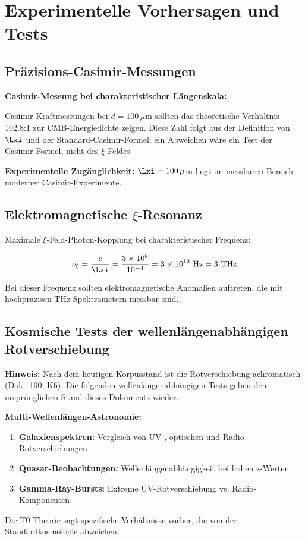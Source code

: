 	\section{Experimentelle Vorhersagen und Tests}
	
	\subsection{Präzisions-Casimir-Messungen}
	
	\begin{experiment}
		\textbf{Casimir-Messung bei charakteristischer Längenskala:}
		
		Casimir-Kraftmessungen bei $d = 100\,\mu$m sollten das theoretische Verhältnis 102.8:1 zur CMB-Energiedichte zeigen. Diese Zahl folgt aus der Definition von $\Lxi$ und der Standard-Casimir-Formel; ein Abweichen wäre ein Test der Casimir-Formel, nicht des $\xi$-Feldes.
		
		\textbf{Experimentelle Zugänglichkeit:} $\Lxi = 100\,\mu$m liegt im messbaren Bereich moderner Casimir-Experimente.
	\end{experiment}
	
	\subsection{Elektromagnetische $\xi$-Resonanz}
	
	Maximale $\xi$-Feld-Photon-Kopplung bei charakteristischer Frequenz:
	
	\begin{equation}
		\nu_\xi = \frac{c}{\Lxi} = \frac{3 \times 10^8}{10^{-4}} = 3 \times 10^{12} \text{ Hz} = 3 \text{ THz}
	\end{equation}
	
	Bei dieser Frequenz sollten elektromagnetische Anomalien auftreten, die mit hochpräzisen THz-Spektrometern messbar sind.
	
	\subsection{Kosmische Tests der wellenlängenabhängigen Rotverschiebung}
	
	\textbf{Hinweis:} Nach dem heutigen Korpusstand ist die Rotverschiebung achromatisch (Dok.~190, K6). Die folgenden wellenlängenabhängigen Tests geben den ursprünglichen Stand dieses Dokuments wieder.
	
	\begin{experiment}
		\textbf{Multi-Wellenlängen-Astronomie:}
		
		\begin{enumerate}
			\item \textbf{Galaxienspektren:} Vergleich von UV-, optischen und Radio-Rotverschiebungen
			\item \textbf{Quasar-Beobachtungen:} Wellenlängenabhängigkeit bei hohen z-Werten
			\item \textbf{Gamma-Ray-Bursts:} Extreme UV-Rotverschiebung vs. Radio-Komponenten
		\end{enumerate}
		
		Die T0-Theorie sagt spezifische Verhältnisse vorher, die von der Standardkosmologie abweichen.
	\end{experiment}
	
